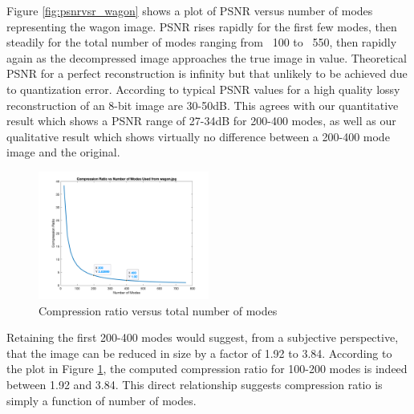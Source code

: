 \documentclass[conference]{IEEEtran}
\begin{document}
    Figure \ref{fig:psnrvsr_wagon} shows a plot of PSNR versus number of modes representing the wagon image. PSNR rises rapidly for the first few modes, then steadily for the total number of modes ranging from ~100 to ~550, then rapidly again as the decompressed image approaches the true image in value. Theoretical PSNR for a perfect reconstruction is infinity but that unlikely to be achieved due to quantization error. According to \cite{psnr_quality} typical PSNR values for a high quality lossy reconstruction of an 8-bit image are 30-50dB. This agrees with our quantitative result which shows a PSNR range of 27-34dB for 200-400 modes, as well as our qualitative result which shows virtually no difference between a 200-400 mode image and the original.

    \begin{figure}[t]
    \includegraphics[width=0.5\textwidth]{comprVsModes_rgb}
    \caption{Compression ratio versus total number of modes}
    \label{fig:comprvsr}
    \end{figure}
    
    Retaining the first 200-400 modes would suggest, from a subjective perspective, that the image can be reduced in size by a factor of 1.92 to 3.84. According to the plot in Figure \ref{fig:comprvsr}, the computed compression ratio for 100-200 modes is indeed between 1.92 and 3.84. This direct relationship suggests compression ratio is simply a function of number of modes.


\end{document}
